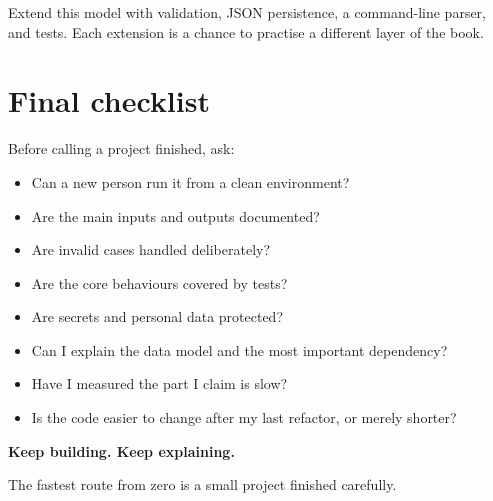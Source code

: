 \documentclass[11pt,openany,oneside]{book}
\begin{document}
Extend this model with validation, JSON persistence, a command-line parser, and tests. Each extension is a chance to practise a different layer of the book.

\chapter*{Final checklist}

Before calling a project finished, ask:

\begin{itemize}
  \item Can a new person run it from a clean environment?
  \item Are the main inputs and outputs documented?
  \item Are invalid cases handled deliberately?
  \item Are the core behaviours covered by tests?
  \item Are secrets and personal data protected?
  \item Can I explain the data model and the most important dependency?
  \item Have I measured the part I claim is slow?
  \item Is the code easier to change after my last refactor, or merely shorter?
\end{itemize}

\begin{center}
\vspace{12mm}
{\sffamily\bfseries\Large Keep building. Keep explaining.\par}
\vspace{4mm}
{\sffamily\color{teal}\large The fastest route from zero is a small project finished carefully.\par}
\end{center}

\printindex
\end{document}
